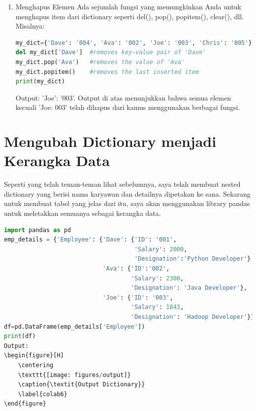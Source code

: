 \begin{enumerate}
Dictionary adalah tipe data yang bisa berubah dan oleh karena itu, teman-teman dapat memperbaruinya jika diperlukan. Misalnya, jika saya ingin mengubah ID karyawan bernama Dave dari '001' menjadi '004' dan jika saya ingin menambahkan pasangan nilai kunci lain ke kamus saya, saya dapat melakukan hal berikut:
\begin{lstlisting}[language=Python, caption=Dict For Loop]
my_dict={'Dave' : '001' , 'Ava': '002' , 'Joe': '003'}
my_dict['Dave'] = '004'   #Updating the value of Dave
my_dict['Chris'] = '005'  #adding a key-value pair
print(my_dict)
\end{lstlisting}
Output:
\begin{lstlisting}
{'Dave': '004', 'Ava': '002', 'Joe': '003', 'Chris': '005'}
\end{lstlisting}
\item Menghapus Elemen
Ada sejumlah fungsi yang memungkinkan Anda untuk menghapus item dari dictionary seperti del(), pop(), popitem(), clear(), dll. Misalnya:
\begin{lstlisting}[language=Python, caption=Dict For Loop]
my_dict={'Dave': '004', 'Ava': '002', 'Joe': '003', 'Chris': '005'}
del my_dict['Dave']  #removes key-value pair of 'Dave'
my_dict.pop('Ava')   #removes the value of 'Ava'
my_dict.popitem()    #removes the last inserted item
print(my_dict)
\end{lstlisting}
Output: {'Joe': '003'}. Output di atas menunjukkan bahwa semua elemen kecuali 'Joe: 003' telah dihapus dari kamus menggunakan berbagai fungsi.
\end{enumerate}

\section{Mengubah Dictionary menjadi Kerangka Data}
Seperti yang telah teman-teman lihat sebelumnya, saya telah membuat nested dictionary yang berisi nama karyawan dan detailnya dipetakan ke sana. Sekarang untuk membuat tabel yang jelas dari itu, saya akan menggunakan library pandas untuk meletakkan semuanya sebagai kerangka data.
\begin{lstlisting}[language=Python, caption=Mengubah Dictionary menjadi Kerangka Data]
import pandas as pd
emp_details = {'Employee': {'Dave': {'ID': '001',
                                     'Salary': 2000,
                                     'Designation':'Python Developer'},
                            'Ava': {'ID':'002',
                                    'Salary': 2300,
                                    'Designation': 'Java Developer'},
                            'Joe': {'ID': '003',
                                    'Salary': 1843,
                                    'Designation': 'Hadoop Developer'}}}
df=pd.DataFrame(emp_details['Employee'])
print(df)
Output:
\begin{figure}[H]
    \centering
    \texttt{[image: figures/output]}
    \caption{\textit{Output Dictionary}}
    \label{colab6}
\end{figure}
\end{lstlisting}


